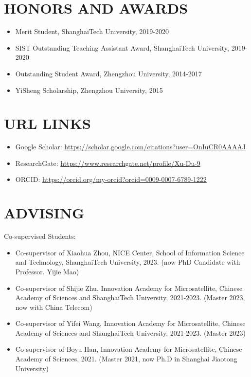 \documentclass[paper=a4,fontsize=11pt]{scrartcl} %
\newcommand{\sepspace}{\vspace*{1em}}		%
\newcommand{\NewPart}[1]{\section*{\uppercase{#1}}}
\newcommand{\EducationEntry}[4]{
		\noindent \textbf{#1} \hfill      %
		\colorbox{White}{%
			\parbox{5cm}{%
			\hfill\color{Black}#2}} \par  %
		\noindent \textit{#3} \par        %
		\noindent\hangindent=2em\hangafter=0 \small #4 %
		\normalsize \par}
\begin{document}
\NewPart{HONORS AND AWARDS}
\begin{itemize}
	\item Merit Student, ShanghaiTech University, 2019-2020
	
	\item SIST Outstanding Teaching Assistant Award, ShanghaiTech University, 2019-2020
		
	
	\item Outstanding Student Award, Zhengzhou University, 2014-2017
	
	\item YiSheng Scholarship, Zhengzhou University, 2015
	
	
	\end{itemize}
%
\NewPart{URL Links}
\begin{itemize}
	\item Google Scholar: \url{https://scholar.google.com/citations?user=OnIuCR0AAAAJ}
	\item ResearchGate: \url{https://www.researchgate.net/profile/Xu-Du-9}
	\item ORCID: \url{https://orcid.org/my-orcid?orcid=0009-0007-6789-1222}
\end{itemize}

\NewPart{Advising}

Co-supervised Students:
\begin{itemize}
	\item Co-supervisor of Xiaohua Zhou, NICE Center, School of Information Science and
	Technology, ShanghaiTech University, 2023. (now PhD Candidate with Professor.
	Yijie Mao)
	
	\item Co-supervisor of Shijie Zhu, Innovation Academy for Microsatellite, Chinese Academy
	of Sciences and ShanghaiTech University, 2021-2023. (Master 2023, now with China
	Telecom)
	
	
	\item Co-supervisor of Yifei Wang, Innovation Academy for Microsatellite, Chinese
	Academy of Sciences and ShanghaiTech University, 2021-2023. (Master 2023)
	
	\item Co-supervisor of Boyu Han, Innovation Academy for Microsatellite, Chinese Academy
	of Sciences, 2021. (Master 2021, now Ph.D in Shanghai Jiaotong University)
\end{itemize}
\end{document}
